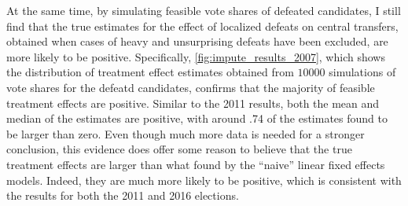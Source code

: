 \documentclass[12pt]{article}
\newcommand{\1}{\mathbbm{1}}
\begin{document}
At the same time, by simulating feasible vote shares of defeated candidates, I still find that the true estimates for the effect of localized defeats on central transfers, obtained when cases of heavy and unsurprising defeats have been excluded, are more likely to be positive. Specifically, \autoref{fig:impute_results_2007}, which shows the distribution of treatment effect estimates obtained from $10000$ simulations of vote shares for the defeatd candidates, confirms that the majority of feasible treatment effects are positive. Similar to the 2011 results, both the mean and median of the estimates are positive, with around .74 of the estimates found to be larger than zero. Even though much more data is needed for a stronger conclusion, this evidence does offer some reason to believe that the true treatment effects are larger than what found by the ``naive'' linear fixed effects models. Indeed, they are much more likely to be positive, which is consistent with the results for both the 2011 and 2016 elections.



\clearpage
{}
\printbibliography[heading=bibintoc]
\end{document}
